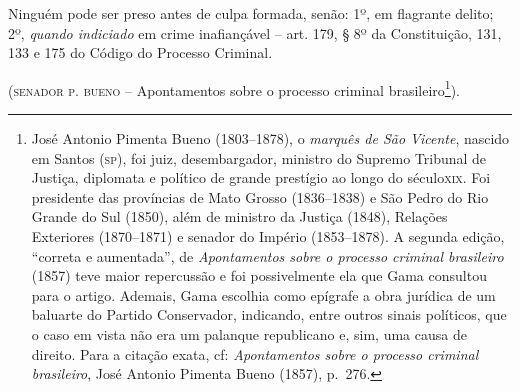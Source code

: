 Ninguém pode ser preso antes de culpa formada, senão: 1º, em flagrante
delito; 2º, \emph{quando indiciado} em crime inafiançável -- art. 179, §
8º da Constituição, 131, 133 e 175 do Código do
Processo Criminal.

(\textsc{senador p. bueno} -- Apontamentos sobre o processo criminal
brasileiro\footnote{ José Antonio Pimenta Bueno (1803--1878), o
  \emph{marquês de São Vicente}, nascido em Santos (\textsc{sp}), foi juiz,
  desembargador, ministro do Supremo Tribunal de Justiça, diplomata e
  político de grande prestígio ao longo do século\textsc{xix}. Foi presidente
  das províncias de Mato Grosso (1836--1838) e São Pedro do Rio Grande do
  Sul (1850), além de ministro da Justiça (1848), Relações Exteriores
  (1870--1871) e senador do Império (1853--1878). A segunda edição,
  ``correta e aumentada'', de \emph{Apontamentos sobre o processo criminal
  brasileiro} (1857) teve maior repercussão e foi possivelmente ela que
  Gama consultou para o artigo. Ademais, Gama escolhia como epígrafe a
  obra jurídica de um baluarte do Partido Conservador, indicando, entre
  outros sinais políticos, que o caso em vista não era um palanque
  republicano e, sim, uma causa de direito. Para a citação exata, cf:
  \emph{Apontamentos sobre o processo criminal brasileiro}, José Antonio
  Pimenta Bueno (1857), p.~276.}).

